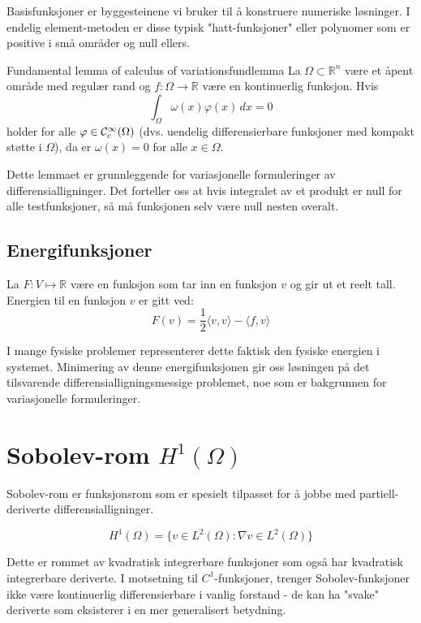 Basisfunksjoner er byggesteinene vi bruker til å konstruere numeriske løsninger. I endelig element-metoden er disse typisk "hatt-funksjoner" eller polynomer som er positive i små områder og null ellers.

\begin{lemma}{Fundamental lemma of calculus of variations}{fundlemma}
	La $\Omega \subset \mathbb{R}^n$ være et åpent område med regulær rand og $f: \Omega \rightarrow \mathbb{R}$ være en kontinuerlig funksjon.
	Hvis
	\begin{equation}
		\int_{\Omega} \omega(x) \varphi(x) \, dx = 0
	\end{equation}
	holder for alle $\varphi \in \mathcal{C}_c^{\infty}(\Omega)$ (dvs. uendelig differensierbare funksjoner med kompakt støtte i $\Omega$), da er $\omega(x) = 0$ for alle $x \in \Omega$.
\end{lemma}

Dette lemmaet er grunnleggende for variasjonelle formuleringer av differensialligninger. Det forteller oss at hvis integralet av et produkt er null for alle testfunksjoner, så må funksjonen selv være null nesten overalt.

\subsection{Energifunksjoner}
La \(F: V \mapsto \mathbb{R}\) være en funksjon som tar inn en funksjon \(v\) og gir ut et reelt tall. Energien til en funksjon \(v\) er gitt ved:
\[
	F(v) = \frac{1}{2} \langle v, v \rangle - \langle f, v \rangle
\]

I mange fysiske problemer representerer dette faktisk den fysiske energien i systemet. Minimering av denne energifunksjonen gir oss løsningen på det tilsvarende differensialligningsmessige problemet, noe som er bakgrunnen for variasjonelle formuleringer.

\section[Sobolev-rom]{Sobolev-rom \(H^1(\Omega)\)}
Sobolev-rom er funksjonsrom som er spesielt tilpasset for å jobbe med partiell-deriverte differensialligninger.

\begin{equation}
	H^1(\Omega) = \{ v \in L^2(\Omega) : \nabla v \in L^2(\Omega) \}
\end{equation}

Dette er rommet av kvadratisk integrerbare funksjoner som også har kvadratisk integrerbare deriverte. I motsetning til $C^1$-funksjoner, trenger Sobolev-funksjoner ikke være kontinuerlig differensierbare i vanlig forstand - de kan ha "svake" deriverte som eksisterer i en mer generalisert betydning.

